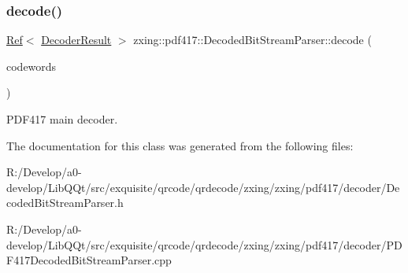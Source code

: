 \subsubsection{\texorpdfstring{decode()}{decode()}}
{\footnotesize\ttfamily \mbox{\hyperlink{classzxing_1_1_ref}{Ref}}$<$ \mbox{\hyperlink{classzxing_1_1_decoder_result}{Decoder\+Result}} $>$ zxing\+::pdf417\+::\+Decoded\+Bit\+Stream\+Parser\+::decode (\begin{DoxyParamCaption}\item[{\mbox{\hyperlink{classzxing_1_1_array_ref}{Array\+Ref}}$<$ int $>$}]{codewords }\end{DoxyParamCaption})\hspace{0.3cm}{\ttfamily [static]}}

P\+D\+F417 main decoder. 

The documentation for this class was generated from the following files\+:\begin{DoxyCompactItemize}
\item 
R\+:/\+Develop/a0-\/develop/\+Lib\+Q\+Qt/src/exquisite/qrcode/qrdecode/zxing/zxing/pdf417/decoder/Decoded\+Bit\+Stream\+Parser.\+h\item 
R\+:/\+Develop/a0-\/develop/\+Lib\+Q\+Qt/src/exquisite/qrcode/qrdecode/zxing/zxing/pdf417/decoder/P\+D\+F417\+Decoded\+Bit\+Stream\+Parser.\+cpp\end{DoxyCompactItemize}
